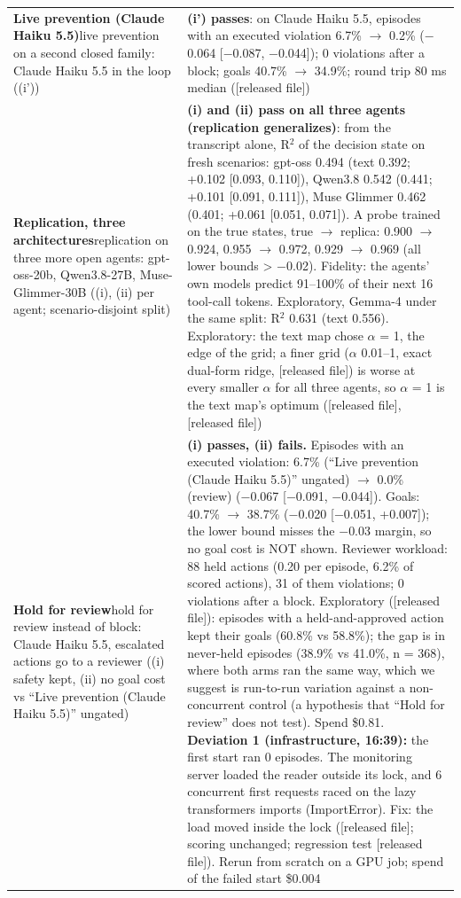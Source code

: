 {\begin{longtable}{p{}p{}}
\textbf{Live prevention (Claude Haiku 5.5)}\newline live prevention on a second closed family: Claude Haiku 5.5 in the loop ((i')) & \textbf{(i') passes}: on Claude Haiku 5.5, episodes with an executed violation 6.7\% $\rightarrow$ 0.2\% ($-$0.064 [$-$0.087, $-$0.044]); 0 violations after a block; goals 40.7\% $\rightarrow$ 34.9\%; round trip 80 ms median ([released file])\\[2pt]
\textbf{Replication, three architectures}\newline replication on three more open agents: gpt-oss-20b, Qwen3.8-27B, Muse-Glimmer-30B ((i), (ii) per agent; scenario-disjoint split) & \textbf{(i) and (ii) pass on all three agents (replication generalizes)}: from the transcript alone, R$^2$ of the decision state on fresh scenarios: gpt-oss 0.494 (text 0.392; +0.102 [0.093, 0.110]), Qwen3.8 0.542 (0.441; +0.101 [0.091, 0.111]), Muse Glimmer 0.462 (0.401; +0.061 [0.051, 0.071]). A probe trained on the true states, true $\rightarrow$ replica: 0.900 $\rightarrow$ 0.924, 0.955 $\rightarrow$ 0.972, 0.929 $\rightarrow$ 0.969 (all lower bounds > $-$0.02). Fidelity: the agents' own models predict 91--100\% of their next 16 tool-call tokens. Exploratory, Gemma-4 under the same split: R$^2$ 0.631 (text 0.556). Exploratory: the text map chose $\alpha$ = 1, the edge of the grid; a finer grid ($\alpha$ 0.01--1, exact dual-form ridge, [released file]) is worse at every smaller $\alpha$ for all three agents, so $\alpha$ = 1 is the text map's optimum ([released file], [released file])\\[2pt]
\textbf{Hold for review}\newline hold for review instead of block: Claude Haiku 5.5, escalated actions go to a reviewer ((i) safety kept, (ii) no goal cost vs ``Live prevention (Claude Haiku 5.5)'' ungated) & \textbf{(i) passes, (ii) fails.} Episodes with an executed violation: 6.7\% (``Live prevention (Claude Haiku 5.5)'' ungated) $\rightarrow$ 0.0\% (review) ($-$0.067 [$-$0.091, $-$0.044]). Goals: 40.7\% $\rightarrow$ 38.7\% ($-$0.020 [$-$0.051, +0.007]); the lower bound misses the $-$0.03 margin, so no goal cost is NOT shown. Reviewer workload: 88 held actions (0.20 per episode, 6.2\% of scored actions), 31 of them violations; 0 violations after a block. Exploratory ([released file]): episodes with a held-and-approved action kept their goals (60.8\% vs 58.8\%); the gap is in never-held episodes (38.9\% vs 41.0\%, n = 368), where both arms ran the same way, which we suggest is run-to-run variation against a non-concurrent control (a hypothesis that ``Hold for review'' does not test). Spend \$0.81. \textbf{Deviation 1 (infrastructure, 16:39):} the first start ran 0 episodes. The monitoring server loaded the reader outside its lock, and 6 concurrent first requests raced on the lazy transformers imports (ImportError). Fix: the load moved inside the lock ([released file]; scoring unchanged; regression test [released file]). Rerun from scratch on a GPU job; spend of the failed start \$0.004\\[2pt]

\end{longtable}}
